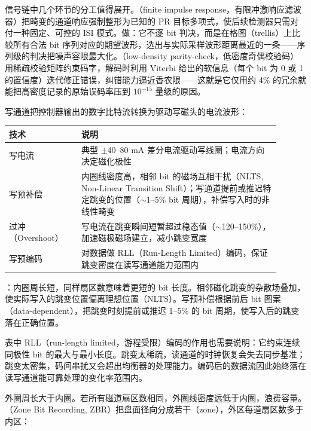 信号链中几个环节的分工值得展开。（finite impulse response，有限冲激响应滤波器）把畸变的通道响应强制整形为已知的 PR 目标多项式，使后续检测器只需对付一种固定、可控的 ISI 模式。做：它不逐 bit 判决，而是在格图（trellis）上比较所有合法 bit 序列对应的期望波形，选出与实际采样波形距离最近的一条——序列级的判决把噪声容限最大化。（low-density parity-check，低密度奇偶校验码）用稀疏校验矩阵约束码字，解码时利用 Viterbi 给出的软信息（每个 bit 为 0 或 1 的置信度）迭代修正错误，纠错能力逼近香农限——这就是它仅用约 4\% 的冗余就能把高密度记录的原始误码率压到 $10^{-15}$ 量级的原因。


写通道把控制器输出的数字比特流转换为驱动写磁头的电流波形：

\begin{longtable}{L{0.24\linewidth}L{0.66\linewidth}}
\toprule
技术 & 说明 \\
\midrule
写电流 & 典型 $\pm$40--80 mA 差分电流驱动写线圈；电流方向决定磁化极性 \\\tablerowrule
写预补偿 & 内圈线密度高，相邻 bit 的磁场互相干扰（NLTS, Non-Linear Transition Shift）；写通道提前或推迟特定跳变的位置（$\sim$1--5\% bit 周期），补偿写入时的非线性畸变 \\\tablerowrule
过冲（Overshoot） & 写电流在跳变瞬间短暂超过稳态值（$\sim$120--150\%），加速磁极磁场建立，减小跳变宽度 \\\tablerowrule
写预编码 & 对数据做 RLL（Run-Length Limited）编码，保证跳变密度在读写通道能力范围内 \\
\bottomrule
\end{longtable}

：内圈周长短，同样扇区数意味着更短的 bit 长度。相邻磁化跳变的杂散场叠加，使实际写入的跳变位置偏离理想位置（NLTS）。写预补偿根据前后 bit 图案（data-dependent），把跳变时刻提前或推迟 1--5\% 的 bit 周期，使写入后的跳变落在正确位置。

表中 RLL（run-length limited，游程受限）编码的作用也需要说明：它约束连续同极性 bit 的最大与最小长度。跳变太稀疏，读通道的时钟恢复会失去同步基准；跳变太密集，码间串扰又会超出均衡器的处理能力。编码后的数据流因此始终落在读写通道能可靠处理的变化率范围内。


外圈周长大于内圈。若所有磁道扇区数相同，外圈线密度远低于内圈，浪费容量。（Zone Bit Recording, ZBR）把盘面径向分成若干（zone），外区每道扇区数多于内区：

